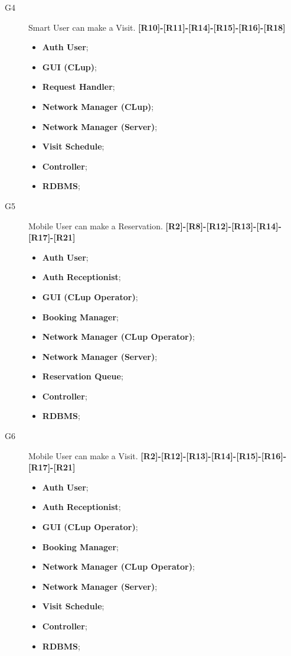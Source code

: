 \begin{description}
    
    \item[G4]Smart User can make a Visit. \textbf{[R10]-[R11]-[R14]-[R15]-[R16]-[R18]}
    \begin{itemize}
        \item \textbf{Auth User};  
        \item \textbf{GUI (CLup)};  
        \item \textbf{Request Handler}; 
        \item \textbf{Network Manager (CLup)}; 
        \item \textbf{Network Manager (Server)};  
        \item \textbf{Visit Schedule};  
        \item \textbf{Controller};
        \item \textbf{RDBMS};
    \end{itemize}
    
    \item[G5]Mobile User can make a Reservation. \textbf{[R2]-[R8]-[R12]-[R13]-[R14]-[R17]-[R21]}
    \begin{itemize}
        \item \textbf{Auth User}; 
        \item \textbf{Auth Receptionist};  
        \item \textbf{GUI (CLup Operator)};  
        \item \textbf{Booking Manager}; 
        \item \textbf{Network Manager (CLup Operator)}; 
        \item \textbf{Network Manager (Server)};  
        \item \textbf{Reservation Queue};  
        \item \textbf{Controller};
        \item \textbf{RDBMS};
    \end{itemize}
    
    \item[G6]Mobile User can make a Visit. \textbf{[R2]-[R12]-[R13]-[R14]-[R15]-[R16]-[R17]-[R21]}
     \begin{itemize}
        \item \textbf{Auth User}; 
        \item \textbf{Auth Receptionist};  
        \item \textbf{GUI (CLup Operator)};  
        \item \textbf{Booking Manager}; 
        \item \textbf{Network Manager (CLup Operator)}; 
        \item \textbf{Network Manager (Server)};  
        \item \textbf{Visit Schedule};  
        \item \textbf{Controller};
        \item \textbf{RDBMS};
    \end{itemize}
    

\end{description}

